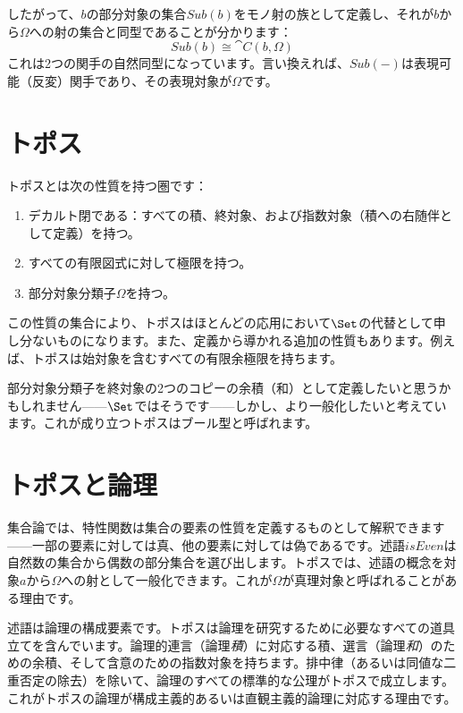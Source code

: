 したがって、$b$の部分対象の集合$\mathit{Sub}(b)$をモノ射の族として定義し、それが$b$から$\Omega$への射の集合と同型であることが分かります：
\[\mathit{Sub}(b) \cong \cat{C}(b, \Omega)\]
これは2つの関手の自然同型になっています。言い換えれば、$\mathit{Sub}(-)$は表現可能（反変）関手であり、その表現対象が$\Omega$です。

\section{トポス}

トポスとは次の性質を持つ圏です：

\begin{enumerate}
  \tightlist
  \item
        デカルト閉である：すべての積、終対象、および指数対象（積への右随伴として定義）を持つ。
  \item
        すべての有限図式に対して極限を持つ。
  \item
        部分対象分類子$\Omega$を持つ。
\end{enumerate}

この性質の集合により、トポスはほとんどの応用において$\Set$の代替として申し分ないものになります。また、定義から導かれる追加の性質もあります。例えば、トポスは始対象を含むすべての有限余極限を持ちます。

部分対象分類子を終対象の2つのコピーの余積（和）として定義したいと思うかもしれません——$\Set$ではそうです——しかし、より一般化したいと考えています。これが成り立つトポスはブール型と呼ばれます。

\section{トポスと論理}

集合論では、特性関数は集合の要素の性質を定義するものとして解釈できます——一部の要素に対しては真、他の要素に対しては偽であるです。述語$\mathit{isEven}$は自然数の集合から偶数の部分集合を選び出します。トポスでは、述語の概念を対象$a$から$\Omega$への射として一般化できます。これが$\Omega$が真理対象と呼ばれることがある理由です。

述語は論理の構成要素です。トポスは論理を研究するために必要なすべての道具立てを含んでいます。論理的連言（論理\emph{積}）に対応する積、選言（論理\emph{和}）のための余積、そして含意のための指数対象を持ちます。排中律（あるいは同値な二重否定の除去）を除いて、論理のすべての標準的な公理がトポスで成立します。これがトポスの論理が構成主義的あるいは直観主義的論理に対応する理由です。

